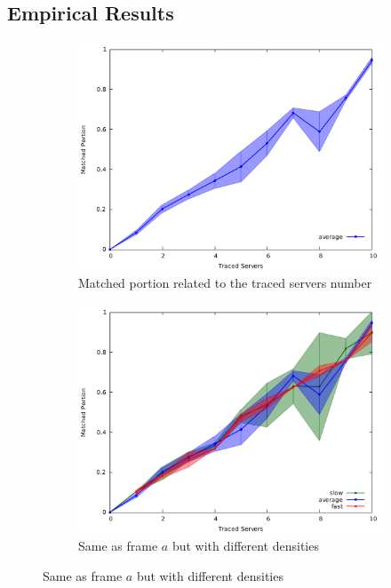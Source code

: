 \subsection{Empirical Results}
\begin{figure}[H]
	\begin{subfigure}{.5\textwidth}
		\centering
		\includegraphics[width=1\linewidth]{graphs/s_server_mport_average_only.pdf}
		\caption{Matched portion related to the traced servers number}
		\label{fig:g_mporta}
	\end{subfigure} 
	\begin{subfigure}{.5\textwidth}
		\centering
		\includegraphics[width=1\linewidth]{graphs/s_server_mport.pdf}
		\caption{Same as frame $a$ but with different densities}
		\label{fig:g_mportb}
	\end{subfigure}


\end{figure}
